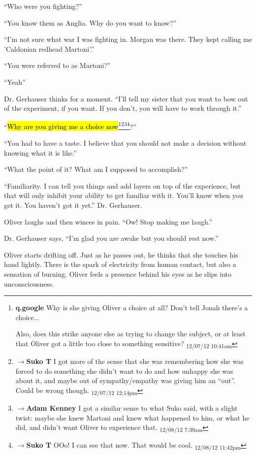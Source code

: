 ``Who were you fighting?''

``You know them as Anglia. Why do you want to know?''

``I'm not sure what war I was fighting in.  Morgan was there.  They kept calling me 'Caldonian redhead Martoni'.''

``You were referred to as Martoni?''

``Yeah''

Dr. Gerhauser thinks for a moment.  ``I'll tell my sister that you want to bow out of the experiment, if you want.  If you don't, you will have to work through it.''

``\hl{Why are you giving me a choice now}\footnote{\textbf{q.google }Why is she giving Oliver a choice at all?  Don't tell Jonah there's a choice...

Also, does this strike anyone else as trying to change the subject, or at least that Oliver got a little too close to something sensitive? \textsubscript{12/07/12 10:41am}}\footnote{$\rightarrow$\textbf{Suko T }I got more of the sense that she was remembering how she was forced to do something she didn't want to do and how unhappy she was about it, and maybe out of sympathy/empathy was giving him an ``out''.   Could be wrong though. \textsubscript{12/07/12 12:14pm}}\footnote{$\rightarrow$\textbf{Adam Kenney }I got a similar sense to what Suko said, with a slight twist: maybe she knew Martoni and knew what happened to him, or what he did, and didn't want Oliver to experience that. \textsubscript{12/08/12 7:39am}}\footnote{$\rightarrow$\textbf{Suko T }OOo!  I can see that now.  That would be cool. \textsubscript{12/08/12 11:42pm}}?''

``You had to have a taste.  I believe that you should not make a decision without knowing what it is like.''

``What the point of it?  What am I supposed to accomplish?''

``Familiarity.  I can tell you things and add layers on top of the experience, but that will only inhibit your ability to get familiar with it.  You'll know when you get it.  You haven't got it yet.''  Dr. Gerhauser.

Oliver laughs and then winces in pain.  ``Ow!  Stop making me laugh.''

Dr. Gerhauser says, ``I'm glad you are awake but you should rest now.''



Oliver starts drifting off.  Just as he passes out, he thinks that she touches his hand lightly.  There is the spark of electricity from human contact, but also a sensation of burning.  Oliver feels a presence behind his eyes as he slips into unconsciousness.



